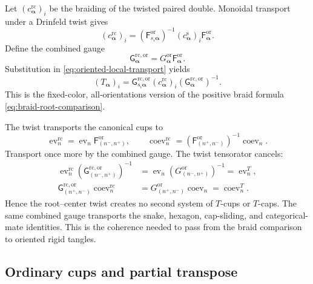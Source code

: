 \documentclass[11pt,a4paper]{article}
\newcommand{\ev}{\operatorname{ev}}
\newcommand{\coev}{\operatorname{coev}}
\newcommand{\rc}{\mathrm{rc}}
\theoremstyle{definition}
\theoremstyle{remark}
\begin{document}
Let \((c_{\boldsymbol\alpha}^{\rc})_i\) be the braiding of the twisted
paired double.  Monoidal transport under a Drinfeld twist gives
\begin{equation}\label{eq:oriented-twisted-braiding}
 (c_{\boldsymbol\alpha}^{\rc})_i
 =
 (\mathsf F_{s_i\boldsymbol\alpha}^{\mathrm{or}})^{-1}
 (c_{\boldsymbol\alpha}^{\mathrm s})_i
 \mathsf F_{\boldsymbol\alpha}^{\mathrm{or}}.
\end{equation}
Define the combined gauge
\begin{equation}\label{eq:combined-oriented-gauge}
 \mathsf G_{\boldsymbol\alpha}^{\rc,\mathrm{or}}
 =
 G_{\boldsymbol\alpha}^{\mathrm{or}}
 \mathsf F_{\boldsymbol\alpha}^{\mathrm{or}}.
\end{equation}
Substitution in \eqref{eq:oriented-local-transport} yields
\begin{equation}\label{eq:oriented-combined-transport}
 (T_{\boldsymbol\alpha})_i
 =
 \mathsf G_{s_i\boldsymbol\alpha}^{\rc,\mathrm{or}}
 (c_{\boldsymbol\alpha}^{\rc})_i
 (\mathsf G_{\boldsymbol\alpha}^{\rc,\mathrm{or}})^{-1}.
\end{equation}
This is the fixed-color, all-orientations version of the positive braid
formula \eqref{eq:braid-root-comparison}.

The twist transports the canonical cups to
\begin{equation}\label{eq:root-center-cups}
\ev_n^{\rc}
=\ev_n\mathsf F_{(n^-,n^+)}^{\mathrm{or}},
\qquad
\coev_n^{\rc}
=(\mathsf F_{(n^+,n^-)}^{\mathrm{or}})^{-1}\coev_n.
\end{equation}
Transport once more by the combined gauge.  The twist tensorator cancels:
\begin{align}
\ev_n^{\rc}
(\mathsf G_{(n^-,n^+)}^{\rc,\mathrm{or}})^{-1}
&=\ev_n(G_{(n^-,n^+)}^{\mathrm{or}})^{-1}
=\ev_n^T,\label{eq:root-center-evaluation-cancels}\\
\mathsf G_{(n^+,n^-)}^{\rc,\mathrm{or}}\coev_n^{\rc}
&=G_{(n^+,n^-)}^{\mathrm{or}}\coev_n
=\coev_n^T.\label{eq:root-center-coevaluation-cancels}
\end{align}
Hence the root--center twist creates no second system of \(T\)-cups or
\(T\)-caps.  The same combined gauge transports the snake, hexagon,
cap-sliding, and categorical-mate identities.  This is the coherence
needed to pass from the braid comparison to oriented rigid tangles.

\subsection{Ordinary cups and partial transpose}
\end{document}
